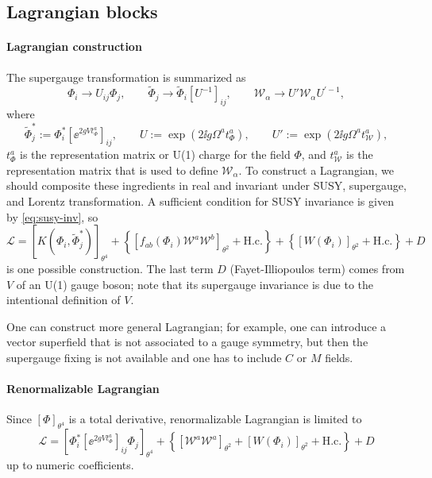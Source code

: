 \documentclass[CheatSheet]{subfiles}
\begin{document}
\subsection{Lagrangian blocks}
\paragraph{Lagrangian construction}
The supergauge transformation is summarized as
\begin{equation}
 \Phi_i   \to U_{ij}\Phi_j,
\qquad
 \tilde\Phi_j \to \tilde\Phi_i [U^{-1}]_{ij},
\qquad
\mathcal W_\alpha\to U'\mathcal W_\alpha U^{\prime-1},
\end{equation}
where
\begin{equation}
 \tilde\Phi^*_j :=  \Phi^*_i [\ee^{2gV t^a_\Phi}]_{ij},
\qquad
 U:=\exp(2\ii g \Omega^at^{a}_\Phi),
\qquad
 U':=\exp(2\ii g \Omega^at^{a}_{\mathcal W}),
\end{equation}
$t^a_\Phi$ is the representation matrix or U(1) charge for the field $\Phi$,
and $t^a_{\mathcal W}$ is the representation matrix that is used to define $\mathcal W_\alpha$.
To construct a Lagrangian, we should composite these ingredients in real and invariant under SUSY, supergauge, and Lorentz transformation.
A sufficient condition for SUSY invariance is given by \eqref{eq:susy-inv}, so
\begin{equation}
 \mathcal L =
\left[K(\Phi_i, \tilde\Phi^*_j)\right]_{\theta^4}
+
\left\{
\left[f_{ab}(\Phi_i)\mathcal W^a\mathcal W^b\right]_{\theta^2} + \text{H.c.}
\right\}
+
\left\{
\left[W(\Phi_i)\right]_{\theta^2} + \text{H.c.}
\right\} + D
\end{equation}
is one possible construction.
The last term $D$ (Fayet-Illiopoulos term) comes from $V$ of an U(1) gauge boson; note that its supergauge invariance is due to the intentional definition of $V$.

One can construct more general Lagrangian; for example, one can introduce a vector superfield that is not associated to a gauge symmetry, but then the supergauge fixing is not available and one has to include $C$ or $M$ fields.

\paragraph{Renormalizable Lagrangian}
Since $[\Phi]_{\theta^4}$ is a total derivative, renormalizable Lagrangian is limited to
\begin{equation}
  \mathcal L =
\left[\Phi^*_i [\ee^{2gV t^a_\Phi}]_{ij}\Phi_j\right]_{\theta^4}
+
\left\{
\left[\mathcal W^a\mathcal W^a\right]_{\theta^2} 
+\left[W(\Phi_i)\right]_{\theta^2} + \text{H.c.}
\right\}
+
D
\end{equation}
up to numeric coefficients.
\end{document}
